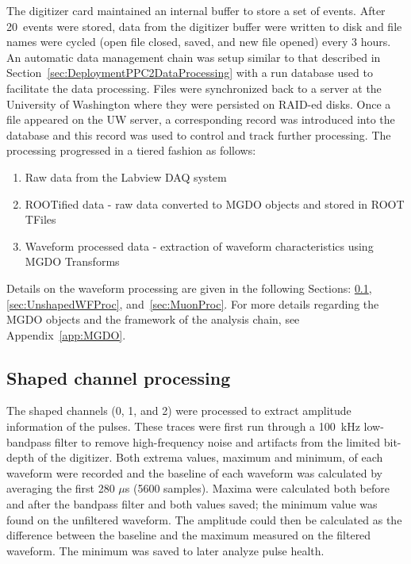 	The digitizer card maintained an internal buffer to store a set of events.  After 20~events were stored, data from the digitizer buffer were written to disk and file names were cycled (open file closed, saved, and new file opened) every 3 hours.  An automatic data management chain was setup similar to that described in Section~\ref{sec:DeploymentPPC2DataProcessing} with a run database used to facilitate the data processing.  Files were synchronized back to a server at the University of Washington where they were persisted on RAID-ed disks.  Once a file appeared on the UW server, a corresponding record was introduced into the database and this record was used to control and track further processing.  The processing progressed in a tiered fashion as follows:
		\begin{enumerate}
			\item[Tier 0:]  Raw data from the Labview DAQ system
			\item[Tier 1:]  ROOTified data - raw data converted to MGDO objects and stored in ROOT TFiles
			\item[Tier 2:]  Waveform processed data - extraction of waveform characteristics using MGDO Transforms
		\end{enumerate}
Details on the waveform processing are given in the following Sections: \ref{sec:BegeShapedProc}, \ref{sec:UnshapedWFProc}, and~\ref{sec:MuonProc}.  For more details regarding the MGDO objects and the framework of the analysis chain, see Appendix~\ref{app:MGDO}.
	
		\subsection{Shaped channel processing}
		\label{sec:BegeShapedProc}

The shaped channels (0, 1, and 2) were processed to extract amplitude information of the pulses.  These traces were first run through a 100~kHz low-bandpass filter to remove high-frequency noise and artifacts from the limited bit-depth of the digitizer.  Both extrema values, maximum and minimum, of each waveform were recorded and the baseline of each waveform was calculated by averaging the first 280 $\mu$s (5600 samples).  Maxima were calculated both before and after the bandpass filter and both values saved; the minimum value was found on the unfiltered waveform.  The amplitude could then be calculated as the difference between the baseline and the maximum measured on the filtered waveform.  The minimum was saved to later analyze pulse health.

